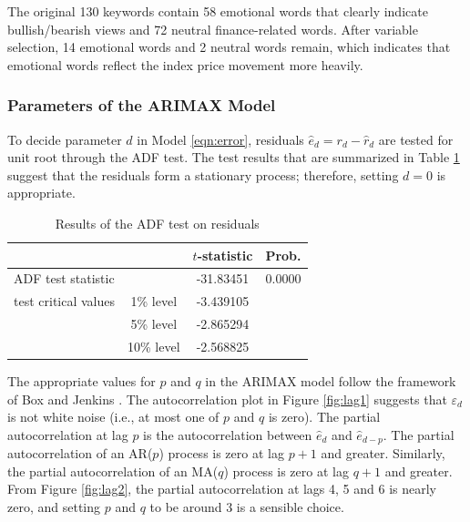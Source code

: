 \documentclass[review,3p,times,12pt,number]{elsarticle}
\begin{document}
The original 130 keywords contain 58 emotional words that clearly indicate bullish/bearish views and 72 neutral finance-related words. After variable selection, 14 emotional words and 2 neutral words remain, which indicates that emotional words reflect the index price movement more heavily.

\subsubsection{Parameters of the ARIMAX Model}
To decide parameter $d$ in Model \ref{eqn:error}, residuals $\hat{e}_d = r_d - \hat{r}_d$ are tested for unit root through the ADF test. The test results that are summarized in Table \ref{tab:t3} suggest that the residuals form a stationary process; therefore, setting $d = 0$ is appropriate.

\begin{table}[htbp]
\caption{Results of the ADF test on residuals}
\label{tab:t3}
\center
\begin{tabular} {l c c c}
\hline
& & $t$-statistic & Prob.\\
\hline
\multicolumn{2}{l}{ADF test statistic}	&-31.83451	&0.0000\\
test critical values	&1\% level	&-3.439105 &\\	
	&5\% level	&-2.865294	&\\
	&10\% level	&-2.568825	&\\
\hline
\end{tabular}
\end{table}


The appropriate values for $p$ and $q$ in the ARIMAX model follow the framework of Box and Jenkins \cite{Box2015Time}. The autocorrelation plot in Figure \ref{fig:lag1} suggests that $\varepsilon_d$ is not white noise (i.e., at most one of $p$ and $q$ is zero). The partial autocorrelation at lag $p$ is the autocorrelation between $\hat e_d$ and $\hat e_{d-p}$. The partial autocorrelation of an AR($p$) process is zero at lag $p+1$ and greater. Similarly, the partial autocorrelation of an MA($q$) process is zero at lag $q+1$ and greater. From Figure \ref{fig:lag2}, the partial autocorrelation at lags 4, 5 and 6 is nearly zero, and setting $p$ and $q$ to be around 3 is a sensible choice.
\end{document}
